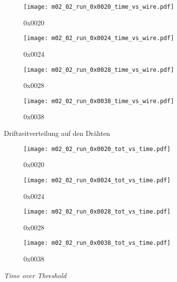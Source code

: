 \documentclass[11pt, ngerman, fleqn, DIV=15, headinclude, BCOR=2cm]{scrreprt}
\begin{document}
\begin{appendix}
	\begin{figure}
		\centering
	\begin{subfigure}[a]{0.45 \textwidth}
		\texttt{[image: m02\_02\_run\_0x0020\_time\_vs\_wire.pdf]}
		\caption{%
			0x0020
		}
		\label{fig:m02_02_run_0x0020_time_vs_wire}
	\end{subfigure}
	\begin{subfigure}[a]{0.45 \textwidth}
		\texttt{[image: m02\_02\_run\_0x0024\_time\_vs\_wire.pdf]}
		\caption{%
			0x0024
		}
		\label{fig:m02_02_run_0x0024_time_vs_wire}
	\end{subfigure}
	\begin{subfigure}[a]{0.45 \textwidth}
		\texttt{[image: m02\_02\_run\_0x0028\_time\_vs\_wire.pdf]}
		\caption{%
			0x0028
		}
		\label{fig:m02_02_run_0x0028_time_vs_wire}
	\end{subfigure}
	\begin{subfigure}[a]{0.45 \textwidth}
		\texttt{[image: m02\_02\_run\_0x0038\_time\_vs\_wire.pdf]}
		\caption{%
			0x0038
		}
		\label{fig:m02_02_run_0x0038_time_vs_wire}
	\end{subfigure}
	\caption{%
		Driftzeitverteilung auf den Drähten
	}
	\label{fig:m02_02_time_vs_wire}
	\end{figure}

	\begin{figure}
		\centering
	\begin{subfigure}[a]{0.45 \textwidth}
		\texttt{[image: m02\_02\_run\_0x0020\_tot\_vs\_time.pdf]}
		\caption{%
			0x0020
		}
		\label{fig:m02_02_run_0x0020_tot_vs_time}
	\end{subfigure}
	\begin{subfigure}[a]{0.45 \textwidth}
		\texttt{[image: m02\_02\_run\_0x0024\_tot\_vs\_time.pdf]}
		\caption{%
			0x0024
		}
		\label{fig:m02_02_run_0x0024_tot_vs_time}
	\end{subfigure}
	\begin{subfigure}[a]{0.45 \textwidth}
		\texttt{[image: m02\_02\_run\_0x0028\_tot\_vs\_time.pdf]}
		\caption{%
			0x0028
		}
		\label{fig:m02_02_run_0x0028_tot_vs_time}
	\end{subfigure}
	\begin{subfigure}[a]{0.45 \textwidth}
		\texttt{[image: m02\_02\_run\_0x0038\_tot\_vs\_time.pdf]}
		\caption{%
			0x0038
		}
		\label{fig:m02_02_run_0x0038_tot_vs_time}
	\end{subfigure}
	\caption{%
		\emph{Time over Threshold}
	}
	\label{fig:m02_02_tot_vs_time}
	\end{figure}
	\clearpage



\end{appendix}
\end{document}
